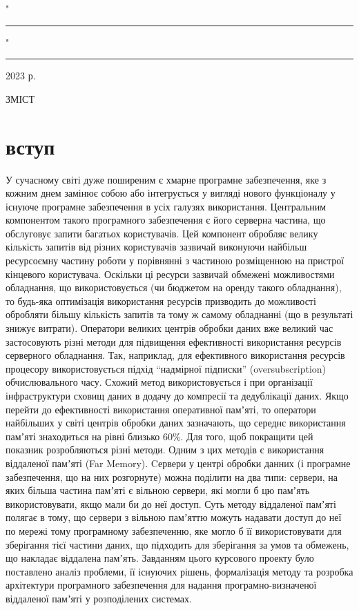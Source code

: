 "\rule{1cm}{0.15mm}" \rule{4cm}{0.15mm} 2023 р.

\pagebreak

\fontsize{14}{17}\selectfont
\begin{center}
ЗМІСТ
\end{center}

\renewcommand\contentsname{}
\tableofcontents

\thispagestyle{empty}

\pagebreak

\chapter{вступ}

    У сучасному світі дуже поширеним є хмарне програмне забезпечення, яке з кожним днем замінює собою або інтегрується у вигляді нового функціоналу у існуюче програмне забезпечення в усіх галузях використання. Центральним компонентом такого програмного забезпечення є його серверна частина, що обслуговує запити багатьох користувачів. Цей компонент обробляє велику кількість запитів від різних користувачів зазвичай виконуючи найбільш ресурсоємну частину роботи у порівнянні з частиною розміщенною на пристрої кінцевого користувача. Оскільки ці ресурси зазвичай обмежені можливостями обладнання, що використовується (чи бюджетом на оренду такого обладнання), то будь-яка оптимізація використання ресурсів призводить до можливості обробляти більшу кількість запитів та тому ж самому обладнанні (що в результаті знижує витрати). 
    Оператори великих центрів обробки даних вже великий час застосовують різні методи для підвищення ефективності використання ресурсів серверного обладнання. Так, наприклад, для ефективного використання ресурсів процесору використовується підхід “надмірної підписки” (oversubscription) обчислювального часу. Схожий метод використовується і при організації інфраструктури сховищ даних в додачу до компресії та дедублікації даних.
Якщо перейти до ефективності використання оперативної памʼяті, то оператори найбільших у світі центрів обробки даних зазначають, що середнє використання памʼяті знаходиться на рівні близько 60\%. Для того, щоб покращити цей показник розробляються різні методи. Одним з цих методів є використання віддаленої памʼяті (Far Memory).
Cервери у центрі обробки данних (і програмне забезпечення, що на них розгорнуте) можна поділити на два типи: 
сервери, на яких більша частина памʼяті є вільною
сервери, які могли б цю памʼять використовувати, якщо мали би до неї доступ. 
    Суть методу віддаленої памʼяті полягає в тому, що сервери з вільною памʼяттю можуть надавати доступ до неї по мережі тому програмному забезпеченню, яке могло б її використовувати для зберігання тієї частини даних, що підходить для зберігання за умов та обмежень, що накладає віддалена памʼять.
    Завданням цього курсового проекту було поставлено аналіз проблеми, її існуючих рішень, формалізація методу та розробка архітектури програмного забезпечення для надання програмно-визначеної віддаленої памʼяті у розподілених системах.

